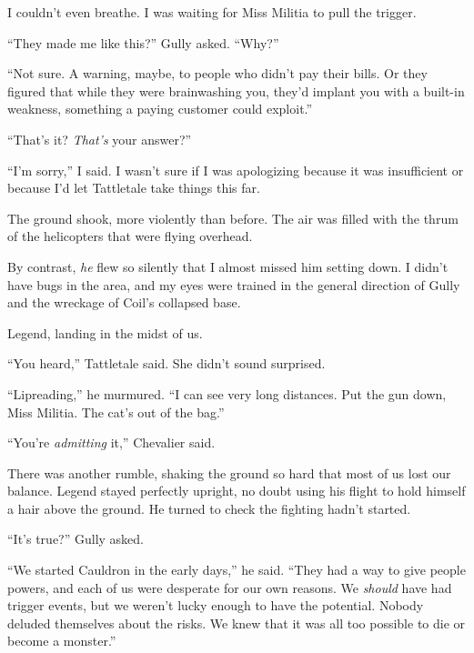 I couldn't even breathe.  I was waiting for Miss Militia to pull the trigger.



``They made me like this?'' Gully asked.  ``Why?''



``Not sure.  A warning, maybe, to people who didn't pay their bills.  Or they figured that while they were brainwashing you, they'd implant you with a built-in weakness, something a paying customer could exploit.''



``That's it?  \emph{That's} your answer?''



``I'm sorry,'' I said.  I wasn't sure if I was apologizing because it was insufficient or because I'd let Tattletale take things this far.



The ground shook, more violently than before.  The air was filled with the thrum of the helicopters that were flying overhead.



By contrast, \emph{he} flew so silently that I almost missed him setting down.  I didn't have bugs in the area, and my eyes were trained in the general direction of Gully and the wreckage of Coil's collapsed base.



Legend, landing in the midst of us.



``You heard,'' Tattletale said.  She didn't sound surprised.



``Lipreading,'' he murmured.  ``I can see very long distances.  Put the gun down, Miss Militia.  The cat's out of the bag.''



``You're \emph{admitting} it,'' Chevalier said.



There was another rumble, shaking the ground so hard that most of us lost our balance.  Legend stayed perfectly upright, no doubt using his flight to hold himself a hair above the ground.  He turned to check the fighting hadn't started.



``It's true?'' Gully asked.



``We started Cauldron in the early days,'' he said.  ``They had a way to give people powers, and each of us were desperate for our own reasons.  We \emph{should} have had trigger events, but we weren't lucky enough to have the potential.  Nobody deluded themselves about the risks.  We knew that it was all too possible to die or become a monster.''



